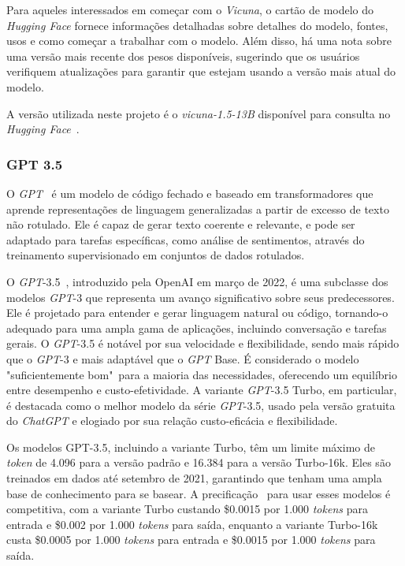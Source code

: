Para aqueles interessados em começar com o \textit{Vicuna}, o cartão de modelo do \textit{Hugging Face} fornece informações detalhadas sobre detalhes do modelo, fontes, usos e como começar a trabalhar com o modelo. Além disso, há uma nota sobre uma versão mais recente dos pesos disponíveis, sugerindo que os usuários verifiquem atualizações para garantir que estejam usando a versão mais atual do modelo.

A versão utilizada neste projeto é o \textit{vicuna-1.5-13B} disponível para consulta no \textit{Hugging Face}~\cite{vicuna1513b}.

\subsubsection{GPT 3.5}
\label{cap:fund_teorica:sec:modelos:subsec:gpt}

O \textit{GPT}~\cite{enwiki:1226113577} é um modelo de código fechado e baseado em transformadores que aprende representações de linguagem generalizadas a partir de excesso de texto não rotulado. Ele é capaz de gerar texto coerente e relevante, e pode ser adaptado para tarefas específicas, como análise de sentimentos, através do treinamento supervisionado em conjuntos de dados rotulados.

O \textit{GPT}-3.5~\cite{openai:gpt35turbo}, introduzido pela OpenAI em março de 2022, é uma subclasse dos modelos \textit{GPT}-3 que representa um avanço significativo sobre seus predecessores. Ele é projetado para entender e gerar linguagem natural ou código, tornando-o adequado para uma ampla gama de aplicações, incluindo conversação e tarefas gerais. O \textit{GPT}-3.5 é notável por sua velocidade e flexibilidade, sendo mais rápido que o \textit{GPT}-3 e mais adaptável que o \textit{GPT} Base. É considerado o modelo "suficientemente bom"\ para a maioria das necessidades, oferecendo um equilíbrio entre desempenho e custo-efetividade. A variante \textit{GPT}-3.5 Turbo, em particular, é destacada como o melhor modelo da série \textit{GPT}-3.5, usado pela versão gratuita do \textit{ChatGPT} e elogiado por sua relação custo-eficácia e flexibilidade.

Os modelos GPT-3.5, incluindo a variante Turbo, têm um limite máximo de \textit{token} de 4.096 para a versão padrão e 16.384 para a versão Turbo-16k. Eles são treinados em dados até setembro de 2021, garantindo que tenham uma ampla base de conhecimento para se basear. A precificação~\cite{openai:gptpricing} para usar esses modelos é competitiva, com a variante Turbo custando \$0.0015 por 1.000 \textit{tokens} para entrada e \$0.002 por 1.000 \textit{tokens} para saída, enquanto a variante Turbo-16k custa \$0.0005 por 1.000 \textit{tokens} para entrada e \$0.0015 por 1.000 \textit{tokens} para saída.

